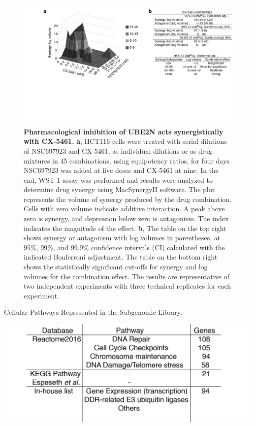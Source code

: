 \begin{figure}
    \centering
    \includegraphics[width=1\textwidth]{../figures/Figure5_drug_synergy}
    \caption[Chromatin ubiquitination]
            {\small{\textbf{Pharmacological inhibition of UBE2N acts synergistically with CX-5461.}}
            \newline
            \textbf{a}, HCT116 cells were treated with serial dilutions of NSC697923 and CX-5461, as individual dilutions or as drug mixtures in 45 combinations, using equipotency ratios, for four days. NSC697923 was added at five doses and CX-5461 at nine. In the end, WST-1 assay was performed and results were analyzed to determine drug synergy using MacSynergyII software. The plot represents the volume of synergy produced by the drug combination. Cells with zero volume indicate additive interaction. A peak above zero is synergy, and depression below zero is antagonism. The index indicates the magnitude of the effect.
            \newline
            \textbf{b}, The table on the top right shows synergy or antagonism with log volumes in parentheses, at 95\%, 99\%, and 99.9\% confidence intervals (CI) calculated with the indicated Bonferroni adjustment. The table on the bottom right shows the statistically significant cut-offs for synergy and log volumes for the combination effect. The results are representative of two independent experiments with three technical replicates for each experiment.
            }
        \label{fig:drug-synergy}
\end{figure}

\clearpage

\begin{table}
\caption{Cellular Pathways Represented in the Subgenomic Library.}
\centering
\includegraphics[width=1\textwidth]{../tables/Table1_library_design}
\label{table:library-design}
\end{table}

